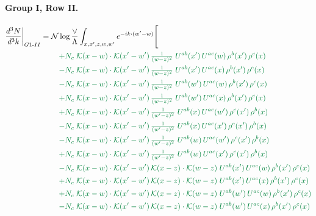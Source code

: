 \documentclass[10pt]{article}
\numberwithin{equation}{section}
\newcommand{\NN}{\mathcal N\log\frac{\vee}{\Lambda}}
\begin{document}
\paragraph{Group I, Row II.}
\begin{align}
\frac{d^3N}{d^3k}\bigg|_{G1\text{-}II}={}&\NN\int_{x,x',z,w,w'}e^{-ik\cdot(w'-w)}\Bigg[\notag\\
&\quad{\color{JIM}+N_c\;\mathcal{K}(x-w)\cdot\mathcal{K}(x'-w')\,\tfrac{1}{(w-z)^{2}}\;U^{ab}(x')\,U^{ac}(w)\,\rho^{b}(x')\,\rho^{c}(x)}\notag\\
&\quad{\color{JIM}-N_c\;\mathcal{K}(x-w)\cdot\mathcal{K}(x'-w')\,\tfrac{1}{(w-z)^{2}}\;U^{ab}(x')\,U^{ac}(x)\,\rho^{b}(x')\,\rho^{c}(x)}\notag\\
&\quad{\color{JIM}-N_c\;\mathcal{K}(x-w)\cdot\mathcal{K}(x'-w')\,\tfrac{1}{(w-z)^{2}}\;U^{ab}(w')\,U^{ac}(w)\,\rho^{b}(x')\,\rho^{c}(x)}\notag\\
&\quad{\color{JIM}+N_c\;\mathcal{K}(x-w)\cdot\mathcal{K}(x'-w')\,\tfrac{1}{(w-z)^{2}}\;U^{ab}(w')\,U^{ac}(x)\,\rho^{b}(x')\,\rho^{c}(x)}\notag\\
&\quad{\color{JIM}+N_c\;\mathcal{K}(x-w)\cdot\mathcal{K}(x'-w')\,\tfrac{1}{(w'-z)^{2}}\;U^{ab}(x)\,U^{ac}(w')\,\rho^{c}(x')\,\rho^{b}(x)}\notag\\
&\quad{\color{JIM}-N_c\;\mathcal{K}(x-w)\cdot\mathcal{K}(x'-w')\,\tfrac{1}{(w'-z)^{2}}\;U^{ab}(x)\,U^{ac}(x')\,\rho^{c}(x')\,\rho^{b}(x)}\notag\\
&\quad{\color{JIM}-N_c\;\mathcal{K}(x-w)\cdot\mathcal{K}(x'-w')\,\tfrac{1}{(w'-z)^{2}}\;U^{ab}(w)\,U^{ac}(w')\,\rho^{c}(x')\,\rho^{b}(x)}\notag\\
&\quad{\color{JIM}+N_c\;\mathcal{K}(x-w)\cdot\mathcal{K}(x'-w')\,\tfrac{1}{(w'-z)^{2}}\;U^{ab}(w)\,U^{ac}(x')\,\rho^{c}(x')\,\rho^{b}(x)}\notag\\
&\quad{\color{JIM}-N_c\;\mathcal{K}(x-w)\cdot\mathcal{K}(x'-w')\,\mathcal{K}(x-z)\cdot\mathcal{K}(w-z)\;U^{ab}(x')\,U^{ac}(w)\,\rho^{b}(x')\,\rho^{c}(x)}\notag\\
&\quad{\color{JIM}+N_c\;\mathcal{K}(x-w)\cdot\mathcal{K}(x'-w')\,\mathcal{K}(x-z)\cdot\mathcal{K}(w-z)\;U^{ab}(x')\,U^{ac}(x)\,\rho^{b}(x')\,\rho^{c}(x)}\notag\\
&\quad{\color{JIM}+N_c\;\mathcal{K}(x-w)\cdot\mathcal{K}(x'-w')\,\mathcal{K}(x-z)\cdot\mathcal{K}(w-z)\;U^{ab}(w')\,U^{ac}(w)\,\rho^{b}(x')\,\rho^{c}(x)}\notag\\
&\quad{\color{JIM}-N_c\;\mathcal{K}(x-w)\cdot\mathcal{K}(x'-w')\,\mathcal{K}(x-z)\cdot\mathcal{K}(w-z)\;U^{ab}(w')\,U^{ac}(x)\,\rho^{b}(x')\,\rho^{c}(x)}\notag\\

\end{align}
\end{document}

